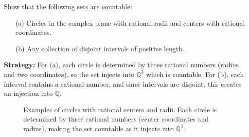 \begin{problembox}
\begin{problemstatement}
Show that the following sets are countable:
\begin{itemize}
\item[(a)] Circles in the complex plane with rational radii and centers with rational coordinates.
\item[(b)] Any collection of disjoint intervals of positive length.
\end{itemize}
\end{problemstatement}
\end{problembox}

\noindent\textbf{Strategy:} For (a), each circle is determined by three rational numbers (radius and two coordinates), so the set injects into $\mathbb{Q}^3$ which is countable. For (b), each interval contains a rational number, and since intervals are disjoint, this creates an injection into $\mathbb{Q}$.

\begin{figure}[h]
\centering
{}
\caption{Examples of circles with rational centers and radii. Each circle is determined by three rational numbers (center coordinates and radius), making the set countable as it injects into $\mathbb{Q}^3$.}
\end{figure}

